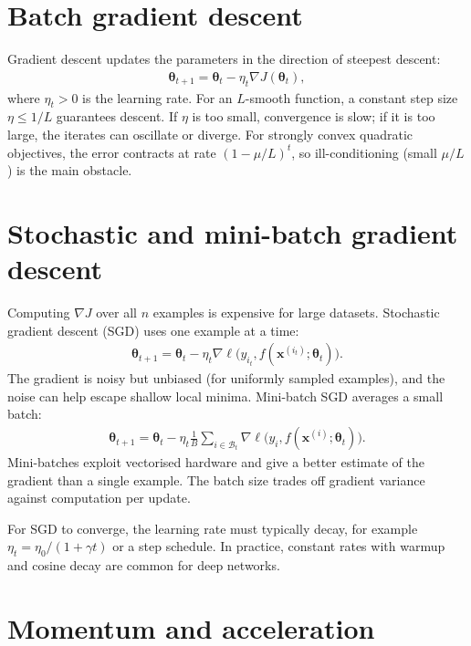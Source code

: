 \documentclass[a4paper, 12pt]{book}
\begin{document}
\section{Batch gradient descent}

Gradient descent updates the parameters in the direction of steepest descent:
\begin{align}
    \boldsymbol{\theta}_{t+1}
    = \boldsymbol{\theta}_t - \eta_t \nabla J(\boldsymbol{\theta}_t),
\end{align}
where $\eta_t>0$ is the learning rate. For an $L$-smooth function, a constant step
size $\eta \leq 1/L$ guarantees descent. If $\eta$ is too small, convergence is slow;
if it is too large, the iterates can oscillate or diverge. For strongly convex
quadratic objectives, the error contracts at rate
$(1-\mu/L)^t$, so ill-conditioning (small $\mu/L$) is the main obstacle.

\section{Stochastic and mini-batch gradient descent}

Computing $\nabla J$ over all $n$ examples is expensive for large datasets. Stochastic
gradient descent (SGD) uses one example at a time:
\begin{align}
    \boldsymbol{\theta}_{t+1}
    = \boldsymbol{\theta}_t - \eta_t \nabla \ell\big(y_{i_t}, f(\mathbf{x}^{(i_t)};\boldsymbol{\theta}_t)\big).
\end{align}
The gradient is noisy but unbiased (for uniformly sampled examples), and the noise can
help escape shallow local minima. Mini-batch SGD averages a small batch:
\begin{align}
    \boldsymbol{\theta}_{t+1}
    = \boldsymbol{\theta}_t
    - \eta_t \frac{1}{B}\sum_{i \in \mathcal{B}_t}
      \nabla \ell\big(y_i, f(\mathbf{x}^{(i)};\boldsymbol{\theta}_t)\big).
\end{align}
Mini-batches exploit vectorised hardware and give a better estimate of the gradient
than a single example. The batch size trades off gradient variance against
computation per update.

For SGD to converge, the learning rate must typically decay, for example
$\eta_t = \eta_0/(1+\gamma t)$ or a step schedule. In practice, constant rates with
warmup and cosine decay are common for deep networks.

\section{Momentum and acceleration}
\end{document}
